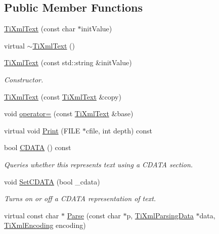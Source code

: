 \subsection*{Public Member Functions}
\begin{DoxyCompactItemize}
\item 
\hyperlink{class_ti_xml_text_af659e77c6b87d684827f35a8f4895960}{Ti\+Xml\+Text} (const char $\ast$init\+Value)
\item 
virtual \hyperlink{class_ti_xml_text_a829a4bd2d8d2461c333eb4f3f5b1b3d2}{$\sim$\+Ti\+Xml\+Text} ()
\item 
\hyperlink{class_ti_xml_text_a439792f6183a3d3fb6f2bc2b16fa5691}{Ti\+Xml\+Text} (const std\+::string \&init\+Value)
\begin{DoxyCompactList}\small\item\em Constructor. \end{DoxyCompactList}\item 
\hyperlink{class_ti_xml_text_a8d2cc1b4af2208cbb0171cf20f6815d1}{Ti\+Xml\+Text} (const \hyperlink{class_ti_xml_text}{Ti\+Xml\+Text} \&copy)
\item 
void \hyperlink{class_ti_xml_text_af5f15d40d048cea7cab9d0eb4fd8a7d2}{operator=} (const \hyperlink{class_ti_xml_text}{Ti\+Xml\+Text} \&base)
\item 
virtual void \hyperlink{class_ti_xml_text_a75f6895906333894e2574cc8cf77ea79}{Print} (F\+I\+LE $\ast$cfile, int depth) const
\item 
bool \hyperlink{class_ti_xml_text_aac1f4764d220ed6bf809b16dfcb6b45a}{C\+D\+A\+TA} () const
\begin{DoxyCompactList}\small\item\em Queries whether this represents text using a C\+D\+A\+TA section. \end{DoxyCompactList}\item 
void \hyperlink{class_ti_xml_text_acb17ff7c5d09b2c839393445a3de5ea9}{Set\+C\+D\+A\+TA} (bool \+\_\+cdata)
\begin{DoxyCompactList}\small\item\em Turns on or off a C\+D\+A\+TA representation of text. \end{DoxyCompactList}\item 
virtual const char $\ast$ \hyperlink{class_ti_xml_text_a8d2dcfa41fc73d3e62dacc2fcf633819}{Parse} (const char $\ast$p, \hyperlink{class_ti_xml_parsing_data}{Ti\+Xml\+Parsing\+Data} $\ast$data, \hyperlink{tinyxml_8h_a88d51847a13ee0f4b4d320d03d2c4d96}{Ti\+Xml\+Encoding} encoding)
\item 

\end{DoxyCompactItemize}
